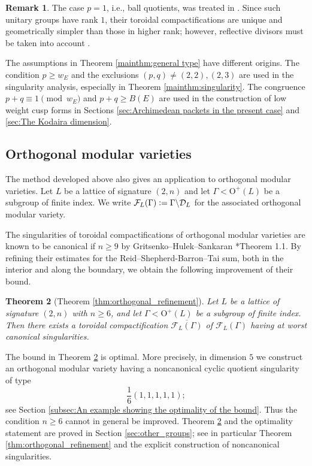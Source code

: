 \documentclass[11pt]{amsart}
\theoremstyle{plain}
\newtheorem{thm}{Theorem}[section]
\theoremstyle{definition}
\newtheorem{rem}[thm]{Remark}
\numberwithin{equation}{section}
\def\O{\mathrm{O}}
\newcommand{\calD}{\mathcal{D}}
\newcommand{\calF}{\mathcal{F}}
\newcommand{\defeq}{\vcentcolon=}
\begin{document}
\begin{rem}
The case $p=1$, i.e., ball quotients, was treated in    \cite{2025_HMY_Kodaira_dimension_ball_quotients}.
 Since such unitary groups have rank $1$, their toroidal compactifications are unique and geometrically simpler than those in higher rank; however, reflective divisors must be taken into account \cite{maeda2024reflective}.
\end{rem}

The assumptions in Theorem \ref{mainthm:general type} have different origins. The condition $p\geq w_E$ and the exclusions $(p,q)\neq(2,2),(2,3)$ are used in the singularity analysis, especially in Theorem \ref{mainthm:singularity}. The congruence $p+q\equiv 1 \pmod{w_E}$ and $p+q \geq B(E)$ are used in the construction of low weight cusp forms in Sections \ref{sec:Archimedean packets in the present case} and \ref{sec:The Kodaira dimension}.
\subsection{Orthogonal modular varieties}
\label{subsec:Application to orthogonal modular varieties}

The method developed above also gives an application to orthogonal
modular varieties.  Let $L$ be a lattice of signature $(2,n)$ and let
$\Gamma<\O^+(L)$ be a subgroup of finite index.  We write
$\calF_L(\Gamma)
  \defeq
  \Gamma\backslash\calD_L$
for the associated orthogonal modular variety.

The singularities of toroidal compactifications of orthogonal modular
varieties are known to be canonical if $n\geq 9$ by Gritsenko--Hulek--Sankaran
\cite{Gritsenko2007kodaira}*{Theorem 1.1}.  By refining their estimates for the Reid--Shepherd-Barron--Tai sum,
both in the interior and along the boundary, we obtain the following
improvement of their bound.

\begin{thm}[{Theorem \ref{thm:orthogonal_refinement}}]
\label{mainthm:orthogonal-singularity}
Let $L$ be a lattice of signature $(2,n)$ with $n\geq 6$, and let
$\Gamma<\O^+(L)$ be a subgroup of finite index.  Then there exists a
toroidal compactification $\overline{\calF_L(\Gamma)}$ of $\calF_L(\Gamma)$ having at worst canonical singularities.
\end{thm}

The bound in Theorem \ref{mainthm:orthogonal-singularity} is optimal.
More precisely, in dimension $5$ we construct an orthogonal modular
variety having a noncanonical cyclic quotient singularity of type
\[
  \frac{1}{6}(1,1,1,1,1);
\]
see Section \ref{subsec:An example showing the optimality of the bound}.
Thus the condition $n\geq 6$ cannot in general be improved.
Theorem \ref{mainthm:orthogonal-singularity} and the optimality
statement are proved in Section \ref{sec:other_groups}; see in
particular Theorem \ref{thm:orthogonal_refinement} and the explicit
construction of noncanonical singularities.
\end{document}
